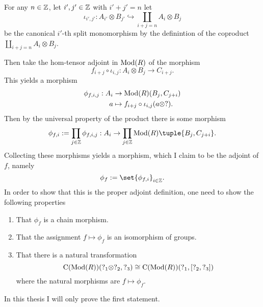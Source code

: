 \begin{remark}
\begin{center}
    \end{center}

    For any \( n \in {\mathbb{Z}} \), let \( i', j' \in {\mathbb{Z}} \) with \( i' + j' = n \) let
    \[
        \iota_{i', j'}: A_{i'} \otimes B_{j'} \hookrightarrow \coprod_{i + j = n} A_i \otimes B_j
    \]
    be the canonical \( i' \)-th split monomorphism by the definintion of the coproduct \( \coprod_{i + j = n} A_i \otimes B_j \).

    Then take the hom-tensor adjoint in \( \operatorname{Mod}(R) \) of the morphism
    \[
        f_{i + j} \circ \iota_{i, j}: A_i \otimes B_j \to C_{i + j}.
    \]
    This yields a morphism
    \begin{align*}
        \phi_{f, i, j}: A_i &\to \operatorname{Mod}(R)(B_j, C_{j + i}) \\
        a &\mapsto f_{i + j} \circ \iota_{i, j}(a \otimes ?).
    \end{align*}
    Then by the universal property of the product there is some morphism
    \[
        \phi_{f, i} := \prod_{j \in \Zb} \phi_{f, i, j}: A_i \to \prod_{j \in \Zb} \Mod(R)\tuple{B_j, C_{j + i}}.
    \]
    Collecting these morphisms yields a morphism, which I claim to be the adjoint of \( f \), namely 
    \[
        \phi_f := \set{\phi_{f, i}}_{i \in \Zb}.
    \]
    In order to show that this is the proper adjoint definition, one need to show the following properties
    \begin{enumerate}
        \item {
            That \( \phi_f \) is a chain morphism.
        }
        \item {
            That the assignment \( f \mapsto \phi_f \) is an isomorphism of groups.
        }
        \item {
            That there is a natural transformation
            \[
                \operatorname{C}(\operatorname{Mod}(R))(?_1 \otimes ?_2, ?_3) \cong \operatorname{C}(\operatorname{Mod}(R))(?_1, \left[ ?_2, ?_3 \right])
            \]
            where the natural morphisms are \( f \mapsto \phi_f \).
        }
    \end{enumerate}
    In this thesis I will only prove the first statement.


\end{remark}
